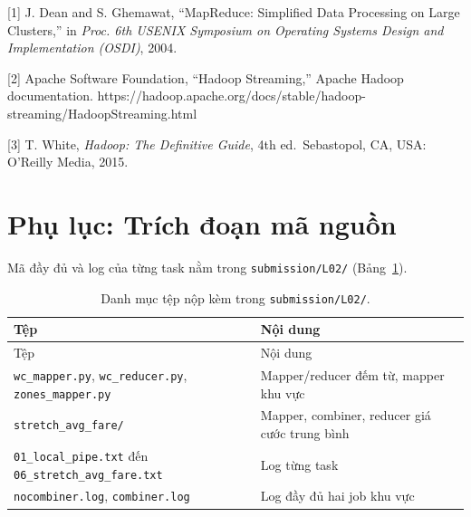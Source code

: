 \documentclass[
  12pt,
  a4paper,
]{article}
\begin{document}
{[}1{]} J. Dean and S. Ghemawat, ``MapReduce: Simplified Data Processing
on Large Clusters,'' in \emph{Proc. 6th USENIX Symposium on Operating
Systems Design and Implementation (OSDI)}, 2004.

{[}2{]} Apache Software Foundation, ``Hadoop Streaming,'' Apache Hadoop
documentation.
https://hadoop.apache.org/docs/stable/hadoop-streaming/HadoopStreaming.html

{[}3{]} T. White, \emph{Hadoop: The Definitive Guide}, 4th
ed.~Sebastopol, CA, USA: O'Reilly Media, 2015.

\section*{Phụ lục: Trích đoạn mã
nguồn}\label{phux1ee5-lux1ee5c-truxedch-ux111oux1ea1n-muxe3-nguux1ed3n}

Mã đầy đủ và log của từng task nằm trong \texttt{submission/L02/}
(Bảng~\ref{tbl:l02-files}).

\begin{longtable}[]{@{}
  >{\raggedright\arraybackslash}p{}
  >{\raggedright\arraybackslash}p{}@{}}
\caption{\label{tbl:l02-files}Danh mục tệp nộp kèm trong
\texttt{submission/L02/}.}\tabularnewline
\toprule\noalign{}
\begin{minipage}[b]{\linewidth}\raggedright
Tệp
\end{minipage} & \begin{minipage}[b]{\linewidth}\raggedright
Nội dung
\end{minipage} \\
\midrule\noalign{}
\endfirsthead
\toprule\noalign{}
\begin{minipage}[b]{\linewidth}\raggedright
Tệp
\end{minipage} & \begin{minipage}[b]{\linewidth}\raggedright
Nội dung
\end{minipage} \\
\midrule\noalign{}
\endhead
\bottomrule\noalign{}
\endlastfoot
\texttt{wc\_mapper.py}, \texttt{wc\_reducer.py},
\texttt{zones\_mapper.py} & Mapper/reducer đếm từ, mapper khu vực \\
\texttt{stretch\_}\allowbreak{}\texttt{avg\_}\allowbreak{}\texttt{fare/}\allowbreak{}
& Mapper, combiner, reducer giá cước trung bình \\
\texttt{01\_}\allowbreak{}\texttt{local\_}\allowbreak{}\texttt{pipe.}\allowbreak{}\texttt{txt}\allowbreak{}
đến
\texttt{06\_}\allowbreak{}\texttt{stretch\_}\allowbreak{}\texttt{avg\_}\allowbreak{}\texttt{fare.}\allowbreak{}\texttt{txt}\allowbreak{}
& Log từng task \\
\texttt{nocombiner.log}, \texttt{combiner.log} & Log đầy đủ hai job khu
vực \\
\end{longtable}
\end{document}
